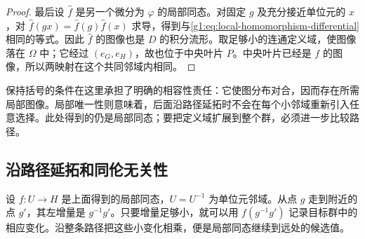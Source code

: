 \begin{proof}
	最后设 \(\widehat f\) 是另一个微分为 \(\varphi\) 的局部同态。对固定 \(g\) 及充分接近单位元的 \(x\)，对 \(\widehat f(gx)=\widehat f(g)\widehat f(x)\) 求导，得到与\eqref{g1:eq:local-homomorphism-differential}相同的等式。因此 \(\widehat f\) 的图像也是 \(D\) 的积分流形。取足够小的连通定义域，使图像落在 \(\Omega\) 中；它经过 \((e_G,e_H)\)，故也位于中央叶片 \(P\)。中央叶片已经是 \(f\) 的图像，所以两映射在这个共同邻域内相同。
\end{proof}

保持括号的条件在这里承担了明确的相容性责任：它使图分布对合，因而存在所需局部图像。局部唯一性则意味着，后面沿路径延拓时不会在每个小邻域重新引入任意选择。此处得到的仍是局部同态；要把定义域扩展到整个群，必须进一步比较路径。

\subsection{沿路径延拓和同伦无关性}
\label{g1:subsec:1604:02}

设 \(f:U\to H\) 是上面得到的局部同态，\(U=U^{-1}\) 为单位元邻域。从点 \(g\) 走到附近的点 \(g'\)，其左增量是 \(g^{-1}g'\)。只要增量足够小，就可以用 \(f(g^{-1}g')\) 记录目标群中的相应变化。沿整条路径把这些小变化相乘，便是局部同态继续到远处的候选值。

